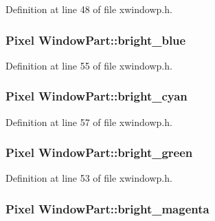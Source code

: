Definition at line 48 of file xwindowp.\+h.

\hypertarget{structWindowPart_a84bcfe34f7e5c0b2f2e4f395cd72b9b7}{
\subsubsection[{bright\+\_\+blue}]{\setlength{\rightskip}{0pt plus 5cm}Pixel Window\+Part\+::bright\+\_\+blue}}\label{structWindowPart_a84bcfe34f7e5c0b2f2e4f395cd72b9b7}


Definition at line 55 of file xwindowp.\+h.

\hypertarget{structWindowPart_ad5ff26f06972c0d1bb38ecc0596b62a1}{
\subsubsection[{bright\+\_\+cyan}]{\setlength{\rightskip}{0pt plus 5cm}Pixel Window\+Part\+::bright\+\_\+cyan}}\label{structWindowPart_ad5ff26f06972c0d1bb38ecc0596b62a1}


Definition at line 57 of file xwindowp.\+h.

\hypertarget{structWindowPart_ad9f52ea1c1ec13b6fa0313dc75debf95}{
\subsubsection[{bright\+\_\+green}]{\setlength{\rightskip}{0pt plus 5cm}Pixel Window\+Part\+::bright\+\_\+green}}\label{structWindowPart_ad9f52ea1c1ec13b6fa0313dc75debf95}


Definition at line 53 of file xwindowp.\+h.

\hypertarget{structWindowPart_a547ade03ce493bb130c6b25ccd169aaa}{
\subsubsection[{bright\+\_\+magenta}]{\setlength{\rightskip}{0pt plus 5cm}Pixel Window\+Part\+::bright\+\_\+magenta}}\label{structWindowPart_a547ade03ce493bb130c6b25ccd169aaa}


